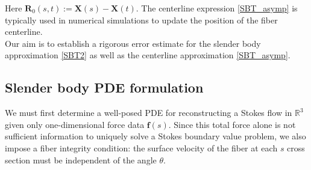 \documentclass[11pt]{article}
\numberwithin{equation}{section}
\newcommand{\R}{\mathbb{R}}
\newcommand{\X}{\bm{X}}
\theoremstyle{definition}
\begin{document}
Here $\bm{R}_0(s,t) := \X(s) -\X(t)$. The centerline expression \eqref{SBT_asymp} is typically used in numerical simulations to update the position of the fiber centerline. \\

Our aim is to establish a rigorous error estimate for the slender body approximation \eqref{SBT2} as well as the centerline approximation \eqref{SBT_asymp}.


\subsection{Slender body PDE formulation}
We must first determine a well-posed PDE for reconstructing a Stokes flow in $\R^3$ given only one-dimensional force data $\bm{f}(s)$. Since this total force alone is not sufficient information to uniquely solve a Stokes boundary value problem, we also impose a fiber integrity condition: the surface velocity of the fiber at each $s$ cross section must be independent of the angle $\theta$. 
\end{document}
